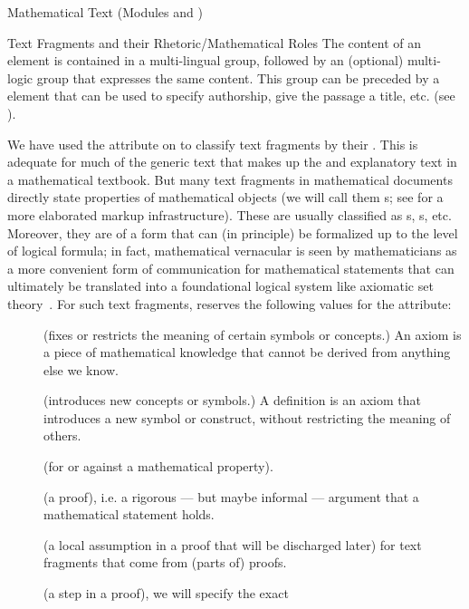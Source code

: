 \begin{tchapter}[id=mtxt,short=Mathematical Text]{Mathematical Text (Modules
  {} and {})}
\begin{tsection}[id=omtext]{Text Fragments and their Rhetoric/Mathematical Roles}
  The content of an {} element is {}
  contained in a multi-lingual {} group, followed by an (optional)
  multi-logic {} group that expresses the same content.  This
  {} group can be preceded by a {} element that can be used
  to specify authorship, give the passage a title, etc. (see {}).

  We have used the {} attribute on {} to classify
  text fragments by their {}. This is adequate for much of the
  generic text that makes up the {} and explanatory text in a
  mathematical textbook. But many text fragments in mathematical documents directly state
  properties of mathematical objects (we will call them
  {s}; see {} for a more elaborated
  markup infrastructure). These are usually classified as {s},
  {s}, etc.  Moreover, they are of a form that can (in principle) be
  formalized up to the level of logical formula; in fact, mathematical vernacular is seen
  by mathematicians as a more convenient form of communication for mathematical statements
  that can ultimately be translated into a foundational logical system like axiomatic set
  theory~\cite{Bernays:ast91}.  For such text fragments, {\omdoc} reserves the following
  values for the {} attribute:
\begin{description}
\item[{}] (fixes or restricts the meaning of certain
  symbols or concepts.) An axiom is a piece of mathematical knowledge that cannot
  be derived from anything else we know.
\item[{}] (introduces new concepts or symbols.) A
  definition is an axiom that introduces a new symbol or construct, without restricting
  the meaning of others.
\item[{}] (for or against a mathematical property).
\item[{}] (a proof), i.e. a rigorous --- but maybe informal
  --- argument that a mathematical statement holds.
\item[{}] (a local assumption in a proof that will be
  discharged later) for text fragments that come from (parts of) proofs.
\item[{}] (a step in a proof), we will specify the exact

\end{description}
\end{tsection}
\end{tchapter}
